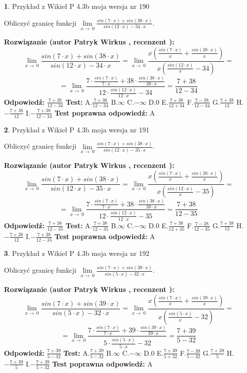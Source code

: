\documentclass[12pt, a4paper]{article}
\theoremstyle{definition} %
\newtheorem{zad}{}
\newcommand{\zadStart}[1]{\begin{zad}#1\newline}
\newcommand{\zadStop}{\end{zad}}
\newcommand{\rozwStart}[2]{\noindent \textbf{Rozwiązanie (autor #1 , recenzent #2): }\newline}
\newcommand{\rozwStop}{\newline}
\newcommand{\odpStart}{\noindent \textbf{Odpowiedź:}\newline}
\newcommand{\odpStop}{\newline}
\newcommand{\testStart}{\noindent \textbf{Test:}\newline}
\newcommand{\testStop}{\newline}
\newcommand{\kluczStart}{\noindent \textbf{Test poprawna odpowiedź:}\newline}
\newcommand{\kluczStop}{\newline}
\begin{document}
\zadStart{Przykład z Wikieł P 4.3b moja wersja nr 190}


Obliczyć granicę funkcji $\lim\limits_{x\to\ 0}\frac{sin(7 \cdot x)+sin(38 \cdot x)}{sin(12 \cdot x)-34 \cdot x}$.
\zadStop
\rozwStart{Patryk Wirkus}{}
$$\lim\limits_{x\to\ 0}\frac{sin(7 \cdot x)+sin(38 \cdot x)}{sin(12 \cdot x)-34 \cdot x}=\lim\limits_{x\to\ 0}\frac{x(\frac{sin(7 \cdot x)}{x}+\frac{sin(38 \cdot x)}{x})}{x(\frac{sin(12 \cdot x)}{x}-34)}=$$
$$=\lim\limits_{x\to\ 0}\frac{7 \cdot \frac{sin(7 \cdot x)}{7 \cdot x}+38 \cdot \frac{sin(38 \cdot x)}{38 \cdot x}}{12 \cdot \frac{sin(12 \cdot x)}{12 \cdot x}-34}=\frac{7+38}{12-34}$$
\rozwStop
\odpStart
$\frac{7+38}{12-34}$
\odpStop
\testStart
A.$\frac{7+38}{12-34}$
B.$\infty$
C.$-\infty$
D.$0$
E.$\frac{7+38}{12+34}$
F.$\frac{7-38}{12-34}$
G.$\frac{7+38}{12}$
H.$-\frac{7+38}{12}$
I.$-\frac{7+38}{12-34}$
\testStop
\kluczStart
A
\kluczStop



\zadStart{Przykład z Wikieł P 4.3b moja wersja nr 191}


Obliczyć granicę funkcji $\lim\limits_{x\to\ 0}\frac{sin(7 \cdot x)+sin(38 \cdot x)}{sin(12 \cdot x)-35 \cdot x}$.
\zadStop
\rozwStart{Patryk Wirkus}{}
$$\lim\limits_{x\to\ 0}\frac{sin(7 \cdot x)+sin(38 \cdot x)}{sin(12 \cdot x)-35 \cdot x}=\lim\limits_{x\to\ 0}\frac{x(\frac{sin(7 \cdot x)}{x}+\frac{sin(38 \cdot x)}{x})}{x(\frac{sin(12 \cdot x)}{x}-35)}=$$
$$=\lim\limits_{x\to\ 0}\frac{7 \cdot \frac{sin(7 \cdot x)}{7 \cdot x}+38 \cdot \frac{sin(38 \cdot x)}{38 \cdot x}}{12 \cdot \frac{sin(12 \cdot x)}{12 \cdot x}-35}=\frac{7+38}{12-35}$$
\rozwStop
\odpStart
$\frac{7+38}{12-35}$
\odpStop
\testStart
A.$\frac{7+38}{12-35}$
B.$\infty$
C.$-\infty$
D.$0$
E.$\frac{7+38}{12+35}$
F.$\frac{7-38}{12-35}$
G.$\frac{7+38}{12}$
H.$-\frac{7+38}{12}$
I.$-\frac{7+38}{12-35}$
\testStop
\kluczStart
A
\kluczStop



\zadStart{Przykład z Wikieł P 4.3b moja wersja nr 192}


Obliczyć granicę funkcji $\lim\limits_{x\to\ 0}\frac{sin(7 \cdot x)+sin(39 \cdot x)}{sin(5 \cdot x)-32 \cdot x}$.
\zadStop
\rozwStart{Patryk Wirkus}{}
$$\lim\limits_{x\to\ 0}\frac{sin(7 \cdot x)+sin(39 \cdot x)}{sin(5 \cdot x)-32 \cdot x}=\lim\limits_{x\to\ 0}\frac{x(\frac{sin(7 \cdot x)}{x}+\frac{sin(39 \cdot x)}{x})}{x(\frac{sin(5 \cdot x)}{x}-32)}=$$
$$=\lim\limits_{x\to\ 0}\frac{7 \cdot \frac{sin(7 \cdot x)}{7 \cdot x}+39 \cdot \frac{sin(39 \cdot x)}{39 \cdot x}}{5 \cdot \frac{sin(5 \cdot x)}{5 \cdot x}-32}=\frac{7+39}{5-32}$$
\rozwStop
\odpStart
$\frac{7+39}{5-32}$
\odpStop
\testStart
A.$\frac{7+39}{5-32}$
B.$\infty$
C.$-\infty$
D.$0$
E.$\frac{7+39}{5+32}$
F.$\frac{7-39}{5-32}$
G.$\frac{7+39}{5}$
H.$-\frac{7+39}{5}$
I.$-\frac{7+39}{5-32}$
\testStop
\kluczStart
A
\kluczStop
\end{document}
